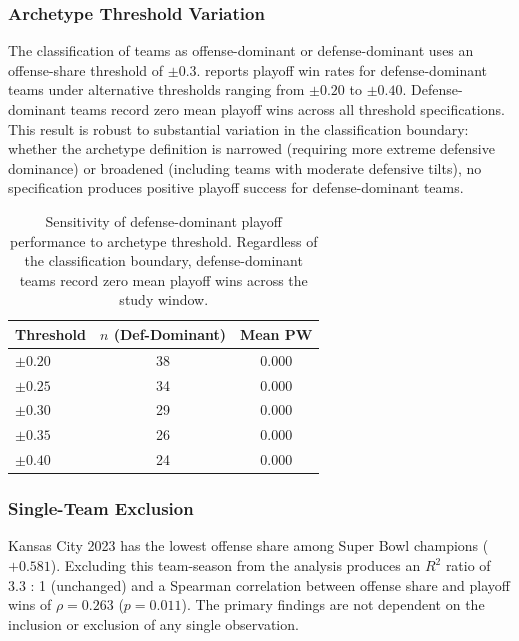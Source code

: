 \subsubsection*{Archetype Threshold Variation}

The classification of teams as offense-dominant or defense-dominant uses
an offense-share threshold of $\pm 0.3$. 
reports playoff win rates for defense-dominant teams under alternative
thresholds ranging from $\pm 0.20$ to $\pm 0.40$. Defense-dominant teams
record zero mean playoff wins across all threshold specifications. This
result is robust to substantial variation in the classification boundary:
whether the archetype definition is narrowed (requiring more extreme
defensive dominance) or broadened (including teams with moderate defensive
tilts), no specification produces positive playoff success for
defense-dominant teams.

\begin{table}[htbp]
  \centering
  \caption[Sensitivity of defense-dominant playoff performance to threshold]{Sensitivity of defense-dominant playoff performance to archetype
           threshold. Regardless of the classification boundary, defense-dominant
           teams record zero mean playoff wins across the study window.}
  \label{tab:sensitivity-threshold}
  \begin{tabular}{lcc}
    \toprule
    \textbf{Threshold} & \textbf{$n$ (Def-Dominant)} & \textbf{Mean PW} \\
    \midrule
    $\pm 0.20$ & 38  & 0.000 \\
    $\pm 0.25$ & 34  & 0.000 \\
    $\pm 0.30$ & 29  & 0.000 \\
    $\pm 0.35$ & 26  & 0.000 \\
    $\pm 0.40$ & 24  & 0.000 \\
    \bottomrule
  \end{tabular}
\end{table}

\subsubsection*{Single-Team Exclusion}

Kansas City 2023 has the lowest offense share among Super Bowl champions
($+0.581$). Excluding this team-season from the analysis produces an $R^2$ ratio
of 3.3 : 1 (unchanged) and a Spearman correlation between offense share and
playoff wins of $\rho = 0.263$ ($p = 0.011$). The primary findings are not
dependent on the inclusion or exclusion of any single observation.

